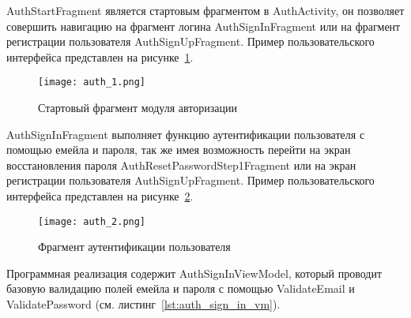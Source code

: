 AuthStartFragment является стартовым фрагментом в AuthActivity, он позволяет совершить навигацию на фрагмент логина AuthSignInFragment или на фрагмент регистрации пользователя AuthSignUpFragment. Пример пользовательского интерфейса представлен на рисунке~\ref{fig:arch:auth_1}.

\begin{figure}[H]
 \centering
   \texttt{[image: auth\_1.png]} 
   \caption{Стартовый фрагмент модуля авторизации}
   \label{fig:arch:auth_1}
\end{figure}

AuthSignInFragment выполняет функцию аутентификации пользователя с помощью емейла и пароля, так же имея возможность перейти на экран восстановления пароля AuthResetPasswordStep1Fragment или на экран регистрации пользователя AuthSignUpFragment. Пример пользовательского интерфейса представлен на рисунке~\ref{fig:arch:auth_2}.

\begin{figure}[H]
 \centering
   \texttt{[image: auth\_2.png]} 
   \caption{Фрагмент аутентификации пользователя}
   \label{fig:arch:auth_2}
\end{figure}

Программная реализация содержит AuthSignInViewModel, который проводит базовую валидацию полей емейла и пароля с помощью ValidateEmail и ValidatePassword (см. листинг~\ref{lst:auth_sign_in_vm}).

